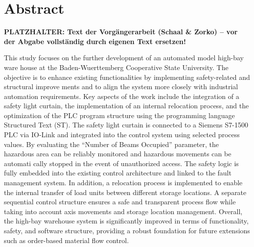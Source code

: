 \section*{Abstract} 

\noindent\colorbox{red!15}{\parbox{\dimexpr\textwidth-2\fboxsep}{\textbf{\color{red}PLATZHALTER: Text der Vorgängerarbeit (Schaal \& Zorko) – vor der Abgabe vollständig durch eigenen Text ersetzen!}}}

This study focuses on the further development of an automated model high-bay ware
house at the Baden-Wuerttemberg Cooperative State University. The objective is to
enhance existing functionalities by implementing safety-related and structural improve
ments and to align the system more closely with industrial automation requirements. Key
aspects of the work include the integration of a safety light curtain, the implementation of
an internal relocation process, and the optimization of the PLC program structure using
the programming language Structured Text (ST). The safety light curtain is connected
to a Siemens S7-1500 PLC via IO-Link and integrated into the control system using
selected process values. By evaluating the “Number of Beams Occupied” parameter, the
hazardous area can be reliably monitored and hazardous movements can be automati
cally stopped in the event of unauthorized access. The safety logic is fully embedded
into the existing control architecture and linked to the fault management system. In
addition, a relocation process is implemented to enable the internal transfer of load units
between different storage locations. A separate sequential control structure ensures
a safe and transparent process flow while taking into account axis movements and
storage location management. Overall, the high-bay warehouse system is significantly
improved in terms of functionality, safety, and software structure, providing a robust
foundation for future extensions such as order-based material flow control.